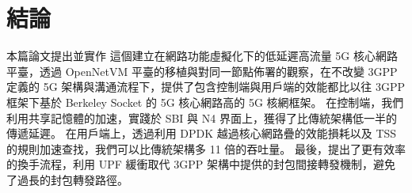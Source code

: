 \chapter{結論}
\label{chapter:conclusion}

本篇論文提出並實作 \LHCN 這個建立在網路功能虛擬化下的低延遲高流量 5G 核心網路平臺，透過 OpenNetVM 平臺的移植與對同一節點佈署的觀察，在不改變 3GPP 定義的 5G 架構與溝通流程下，提供了包含控制端與用戶端的效能都比以往 3GPP 框架下基於 Berkeley Socket 的 5G 核心網路高的 5G 核網框架。
在控制端，我們利用共享記憶體的加速，實踐於 SBI 與 N4 界面上，獲得了比傳統架構低一半的傳遞延遲。
在用戶端上，透過利用 DPDK 越過核心網路疊的效能損耗以及 TSS 的規則加速查找，我們可以比傳統架構多 11 倍的吞吐量。
最後，\LHCN 提出了更有效率的換手流程，利用 UPF 緩衝取代 3GPP 架構中提供的封包間接轉發機制，避免了過長的封包轉發路徑。
